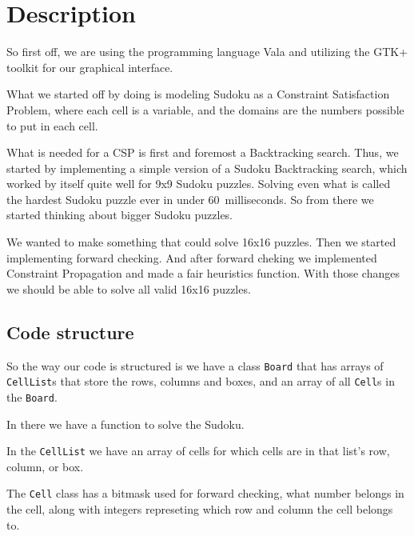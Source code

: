 \documentclass[12pt,a4paper]{article}
\begin{document}

\section*{Description}%

So first off, we are using the programming language Vala and utilizing the GTK+ toolkit for our graphical interface. %

What we started off by doing is modeling Sudoku as a Constraint Satisfaction Problem,
where each cell is a variable, and the domains are the numbers possible to put in each
cell.

What is needed for a CSP is first and foremost a Backtracking search. Thus, we started
by implementing a simple version of a Sudoku Backtracking search, which worked by
itself quite well for 9x9 Sudoku puzzles. Solving even what is called the hardest
Sudoku puzzle ever in under 60~milliseconds. So from there we started thinking about bigger Sudoku puzzles.

We wanted to make something that could solve 16x16 puzzles.
Then we started implementing forward checking. And after forward cheking we 
implemented Constraint Propagation and made a fair heuristics function. With those changes we should be able to solve all valid 16x16 puzzles.

\subsection*{Code structure}

So the way our code is structured is we have a class \verb+Board+ that has arrays of \verb+CellList+s that store the rows, columns and boxes, and an array of all \verb+Cell+s in the \verb+Board+.

In there we have a function to solve the Sudoku.

In the \verb+CellList+ we have an array of cells for which cells are in that list's row, column, or box.

The \verb+Cell+ class has a bitmask used for forward checking,
what number belongs in the cell, along with integers represeting which row and
column the cell belongs to.
\end{document}
